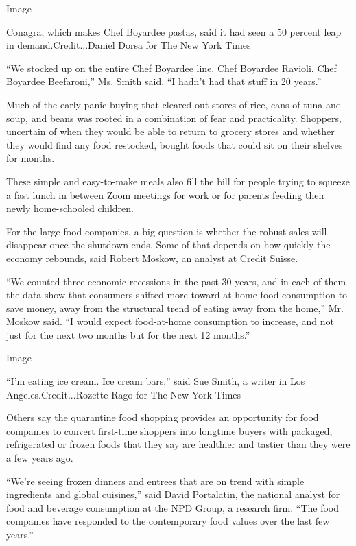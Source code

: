 Image

Conagra, which makes Chef Boyardee pastas, said it had seen a 50 percent
leap in demand.Credit...Daniel Dorsa for The New York Times

``We stocked up on the entire Chef Boyardee line. Chef Boyardee Ravioli.
Chef Boyardee Beefaroni,'' Ms. Smith said. ``I hadn't had that stuff in
20 years.''

Much of the early panic buying that cleared out stores of rice, cans of
tuna and soup, and
\href{https://www.nytimes3xbfgragh.onion/2020/03/22/business/coronavirus-beans-sales.html}{beans}
was rooted in a combination of fear and practicality. Shoppers,
uncertain of when they would be able to return to grocery stores and
whether they would find any food restocked, bought foods that could sit
on their shelves for months.

These simple and easy-to-make meals also fill the bill for people trying
to squeeze a fast lunch in between Zoom meetings for work or for parents
feeding their newly home-schooled children.

For the large food companies, a big question is whether the robust sales
will disappear once the shutdown ends. Some of that depends on how
quickly the economy rebounds, said Robert Moskow, an analyst at Credit
Suisse.

``We counted three economic recessions in the past 30 years, and in each
of them the data show that consumers shifted more toward at-home food
consumption to save money, away from the structural trend of eating away
from the home,'' Mr. Moskow said. ``I would expect food-at-home
consumption to increase, and not just for the next two months but for
the next 12 months.''

Image

``I'm eating ice cream. Ice cream bars,'' said Sue Smith, a writer in
Los Angeles.Credit...Rozette Rago for The New York Times

Others say the quarantine food shopping provides an opportunity for food
companies to convert first-time shoppers into longtime buyers with
packaged, refrigerated or frozen foods that they say are healthier and
tastier than they were a few years ago.

``We're seeing frozen dinners and entrees that are on trend with simple
ingredients and global cuisines,'' said David Portalatin, the national
analyst for food and beverage consumption at the NPD Group, a research
firm. ``The food companies have responded to the contemporary food
values over the last few years.''

